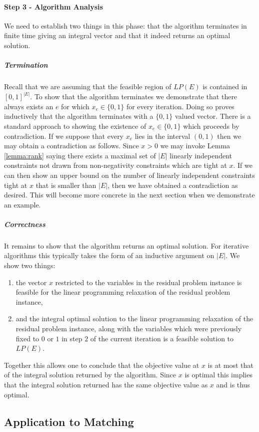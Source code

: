 \paragraph{Step 3 - Algorithm Analysis}
We need to establish two things in this phase: that the algorithm terminates in finite time giving an integral vector and that it indeed returns an optimal solution.
\subparagraph{Termination} Recall that we are assuming that the feasible region of $LP(E)$ is contained in $[0,1]^{|E|}$. To show that the algorithm terminates we demonstrate that there always exists an $e$ for which $x_e \in \{0,1\}$ for every iteration. Doing so proves inductively that the algorithm terminates with a $\{0,1\}$ valued vector. There is a standard approach to showing the existence of $x_e \in \{0,1\}$ which proceeds by contradiction. If we suppose that every $x_e$ lies in the interval $(0,1)$ then we may obtain a contradiction as follows. Since $x>0$ we may invoke Lemma \ref{lemma:rank} saying there exists a maximal set of $|E|$ linearly independent constraints not drawn from non-negativity constraints which are tight at $x$. If we can then show an upper bound on the number of linearly independent constraints tight at $x$ that is smaller than $|E|$, then we have obtained a contradiction as desired. This will become more concrete in the next section when we demonstrate an example.
\subparagraph{Correctness} It remains to show that the algorithm returns an optimal solution. For iterative algorithms this typically takes the form of an inductive argument on $|E|$. We show two things:
\begin{enumerate}
\item the vector $x$ restricted to the variables in the residual problem instance is feasible for the linear programming relaxation of the residual problem instance,
\item and the integral optimal solution to the linear programming relaxation of the residual problem instance, along with the variables which were previously fixed to $0$ or $1$ in step $2$ of the current iteration is a feasible solution to $LP(E)$.
\end{enumerate}
Together this allows one to conclude that the objective value at $x$ is at most that of the integral solution returned by the algorithm. Since $x$ is optimal this implies that the integral solution returned has the same objective value as $x$ and is thus optimal.
\subsection{Application to Matching}\label{subsec:irapp}
